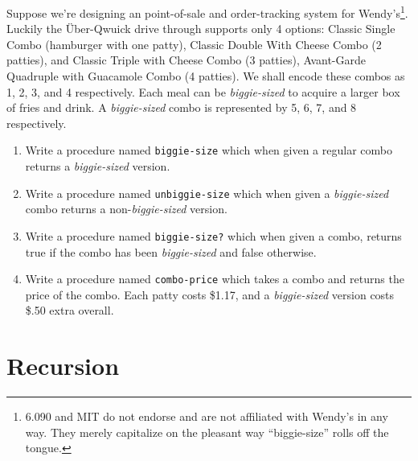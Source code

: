 \begin{enumerate}
Suppose we're designing an point-of-sale and order-tracking
system for Wendy's\footnote{6.090 and MIT do not endorse and are not
affiliated with Wendy's in any way.  They merely capitalize on the
pleasant way ``biggie-size'' rolls off the tongue.}.  Luckily the
\"{U}ber-Qwuick drive through supports only 4 options: Classic Single
Combo (hamburger with one patty), Classic Double With Cheese Combo (2
patties), and Classic Triple with Cheese Combo (3 patties),
Avant-Garde Quadruple with Guacamole Combo (4 patties).  We shall
encode these combos as 1, 2, 3, and 4 respectively.  Each meal can be
{\it biggie-sized} to acquire a larger box of fries and drink.  A {\it
biggie-sized} combo is represented by 5, 6, 7, and 8 respectively.
\begin{enumerate}
\item Write a procedure named {\tt biggie-size} which when given a
regular combo returns a {\it biggie-sized} version.
\vspace{.75in}
\item Write a procedure named {\tt unbiggie-size} which when given a
{\it biggie-sized} combo returns a non-{\it biggie-sized} version.
\vspace{.75in}
\item Write a procedure named {\tt biggie-size?} which when given a
combo, returns true if the combo has been {\it biggie-sized} and false
otherwise.
\vspace{.75in}
\item Write a procedure named {\tt combo-price} which takes a combo
and returns the price of the combo.  Each patty costs \$1.17, and a
{\it biggie-sized} version costs \$.50 extra overall.
\vspace{.75in}
\end{enumerate}

\end{enumerate}

\section*{Recursion}
\vspace{3in}

